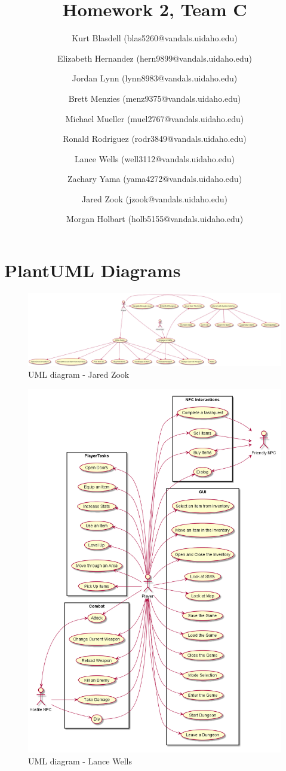 \documentclass[12pt]{report}
\title{Homework 2, Team C}
\author{ Kurt Blasdell (blas5260@vandals.uidaho.edu)
\and Elizabeth Hernandez (hern9899@vandals.uidaho.edu)
\and Jordan Lynn (lynn8983@vandals.uidaho.edu)
\and Brett Menzies (menz9375@vandals.uidaho.edu)
\and Michael Mueller (muel2767@vandals.uidaho.edu)
\and Ronald Rodriguez (rodr3849@vandals.uidaho.edu)
\and Lance Wells (well3112@vandals.uidaho.edu)
\and Zachary Yama (yama4272@vandals.uidaho.edu)
\and Jared Zook (jzook@vandals.uidaho.edu)
\and Morgan Holbart (holb5155@vandals.uidaho.edu)
}
\begin{document}
    \maketitle

\tableofcontents{}

\chapter{PlantUML Diagrams}
\begin{figure}
	\includegraphics[scale=0.25,left]{uml-Jared_Zook.png}
	\caption{UML diagram - Jared Zook}
\end{figure}

\begin{figure}
	\centering
	\includegraphics[scale=0.4,center]{uml-Lance_Wells.png}
	\caption{UML diagram - Lance Wells}
\end{figure}
\end{document}
